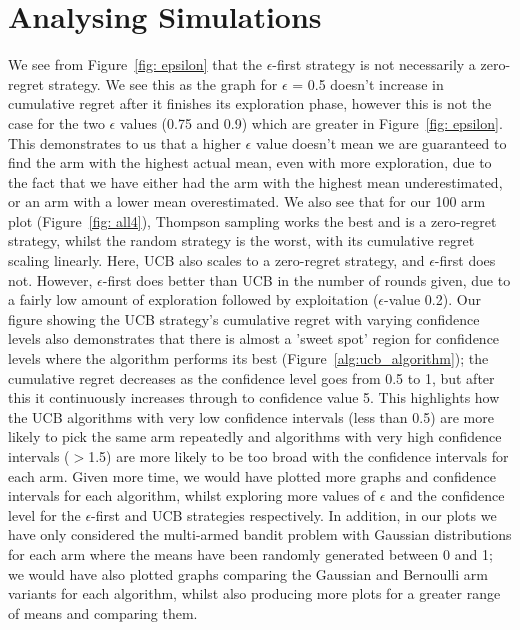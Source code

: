 \section{Analysing Simulations}\label{sec:analysing-simulations}
We see from Figure~\ref{fig: epsilon} that the $\epsilon$-first strategy is not necessarily a zero-regret strategy.
We see this as the graph for $\epsilon$ = 0.5 doesn't increase in cumulative regret after it finishes its exploration phase, however this is not the case for the two $\epsilon$ values (0.75 and 0.9) which are greater in Figure~\ref{fig: epsilon}.
This demonstrates to us that a higher $\epsilon$ value doesn't mean we are guaranteed to find the arm with the highest actual mean, even with more exploration, due to the fact that we have either had the arm with the highest mean underestimated, or an arm with a lower mean overestimated.
\newline
We also see that for our 100 arm plot (Figure~\ref{fig: all4}), Thompson sampling works the best and is a zero-regret strategy, whilst the random strategy is the worst, with its cumulative regret scaling linearly.
Here, UCB also scales to a zero-regret strategy, and $\epsilon$-first does not.
However, $\epsilon$-first does better than UCB in the number of rounds given, due to a fairly low amount of exploration followed by exploitation ($\epsilon$-value 0.2).
\newline
Our figure showing the UCB strategy's cumulative regret with varying confidence levels also demonstrates that there is almost a 'sweet spot' region for confidence levels where the algorithm performs its best (Figure~\ref{alg:ucb_algorithm});
the cumulative regret decreases as the confidence level goes from 0.5 to 1, but after this it continuously increases through to confidence value 5.
This highlights how the UCB algorithms with very low confidence intervals (less than 0.5) are more likely to pick the same arm repeatedly and algorithms with very high confidence intervals ($>$1.5) are more likely to be too broad with the confidence intervals for each arm.
\newline
Given more time, we would have plotted more graphs and confidence intervals for each algorithm, whilst exploring more values of $\epsilon$ and the confidence level for the $\epsilon$-first and UCB strategies respectively.
In addition, in our plots we have only considered the multi-armed bandit problem with Gaussian distributions for each arm where the means have been randomly generated between 0 and 1;
we would have also plotted graphs comparing the Gaussian and Bernoulli arm variants for each algorithm, whilst also producing more plots for a greater range of means and comparing them.